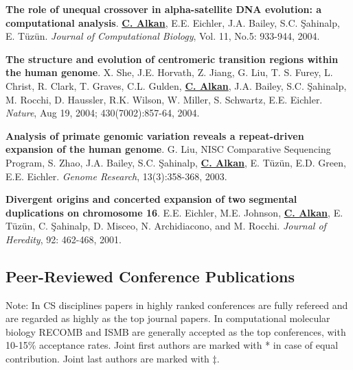 \vspace{-.2cm}
 {\bf The role of unequal crossover in alpha-satellite 
   DNA evolution: a computational analysis}.
  {\bf {\underline{C. Alkan}}}, E.E. Eichler, J.A. Bailey, S.C. \c{S}ahinalp, E. T\"{u}z\"{u}n.
  {\em Journal of Computational Biology}, Vol. 11, No.5: 933-944, 2004. %

\vspace{-.2cm}
  {\bf The structure and evolution of centromeric transition regions within
    the human genome}.
  X. She, J.E. Horvath, Z. Jiang, G. Liu, T. S. Furey,
  L. Christ, R. Clark, T. Graves, C.L. Gulden, {\bf \underline{C. Alkan}}, J.A. Bailey, S.C. \c{S}ahinalp, 
  M. Rocchi, D. Haussler, R.K. Wilson, W. Miller, S. Schwartz, E.E. Eichler.
  {\em Nature}, Aug 19, 2004; 430(7002):857-64, 2004.


\vspace{-.2cm}
  {\bf Analysis of primate genomic variation reveals a repeat-driven 
    expansion of the human genome}.
  G. Liu, NISC Comparative Sequencing Program, S. Zhao, J.A. Bailey, 
  S.C. \c{S}ahinalp, {\bf \underline{C. Alkan}}, E. T\"{u}z\"{u}n, E.D. Green, E.E. Eichler.
  {\em Genome Research}, 13(3):358-368, 2003.

\vspace{-.2cm}
  {\bf Divergent origins and concerted expansion of two segmental
    duplications on 
    chromosome 16}.
  E.E. Eichler, M.E. Johnson, {\bf \underline{C. Alkan}}, E. T\"{u}z\"{u}n, C. \c{S}ahinalp,
    D. Misceo, 
    N. Archidiacono, and M. Rocchi.
    {\em Journal of Heredity}, 92: 462-468, 2001.


\vspace{-.4cm}
\subsection{\small \sc  Peer-Reviewed Conference Publications}
\vspace{-.4cm}
{\small Note: In CS disciplines papers in highly ranked conferences are fully refereed 
and are regarded as highly as the top journal papers. 
In computational molecular biology RECOMB and ISMB are generally accepted as the 
top conferences, with 10-15\% acceptance rates.
Joint first authors are marked with * in case of equal contribution.
Joint last authors are marked with $\ddag$.
}

